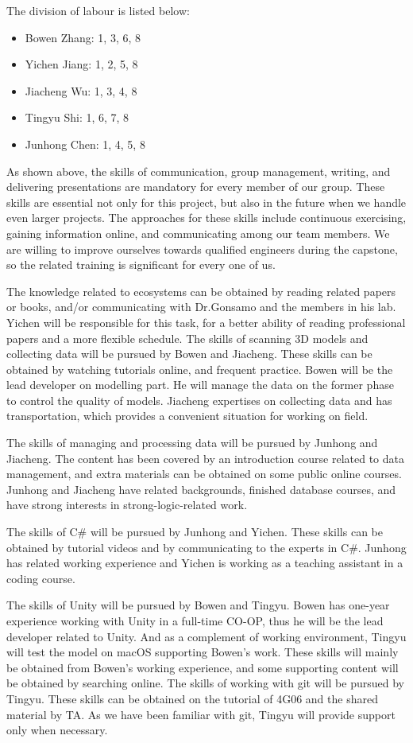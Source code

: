 \documentclass{article}
\begin{document}
The division of labour is listed below:
\begin{itemize}
    \item Bowen Zhang: 1, 3, 6, 8
    \item Yichen Jiang: 1, 2, 5, 8
    \item Jiacheng Wu: 1, 3, 4, 8
    \item Tingyu Shi: 1, 6, 7, 8
    \item Junhong Chen: 1, 4, 5, 8
\end{itemize}

As shown above, the skills of communication, group management, writing, and delivering presentations are mandatory for every member of our group. These skills are essential not only for this project, but also in the future when we handle even larger projects. The approaches for these skills include continuous exercising, gaining information online, and communicating among our team members. We are willing to improve ourselves towards qualified engineers during the capstone, so the related training is significant for every one of us. 

The knowledge related to ecosystems can be obtained by reading related papers or books, and/or communicating with Dr.Gonsamo and the members in his lab. Yichen will be responsible for this task, for a better ability of reading professional papers and a more flexible schedule. 
The skills of scanning 3D models and collecting data will be pursued by Bowen and Jiacheng. These skills can be obtained by watching tutorials online, and frequent practice. Bowen will be the lead developer on modelling part. He will manage the data on the former phase to control the quality of models. Jiacheng expertises on collecting data and has transportation, which provides a convenient situation for working on field.

The skills of managing and processing data will be pursued by Junhong and Jiacheng. The content has been covered by an introduction course related to data management, and extra materials can be obtained on some public online courses. Junhong and Jiacheng have related backgrounds, finished database courses, and have strong interests in strong-logic-related work. 

The skills of C\# will be pursued by Junhong and Yichen. These skills can be obtained by tutorial videos and by communicating to the experts in C\#. Junhong has related working experience and Yichen is working as a teaching assistant in a coding course. 

The skills of Unity will be pursued by Bowen and Tingyu. Bowen has one-year experience working with Unity in a full-time CO-OP, thus he will be the lead developer related to Unity. And as a complement of working environment, Tingyu will test the model on macOS supporting Bowen's work. These skills will mainly be obtained from Bowen's working experience, and some supporting content will be obtained by searching online. 
The skills of working with git will be pursued by Tingyu. These skills can be obtained on the tutorial of 4G06 and the shared material by TA. As we have been familiar with git, Tingyu will provide support only when necessary. 
\end{document}
